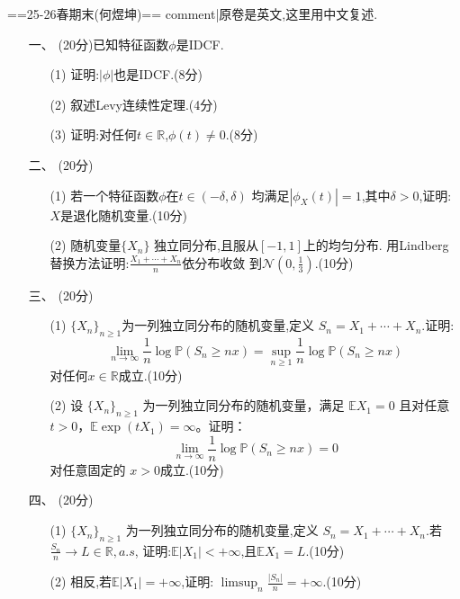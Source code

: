 
==25-26春期末(何煜坤)==
{{comment|原卷是英文,这里用中文复述.}}
\begin{itemize}
    \item[一、](20分)已知特征函数$\phi$是IDCF.
    \begin{itemize}
        \item[(1)]证明:$|\phi|$也是IDCF.(8分)
        \item[(2)]叙述Levy连续性定理.(4分)
        \item[(3)]证明:对任何$t\in\mathbb{R}$,$\phi(t)\ne 0$.(8分)
    \end{itemize}
    \item[二、](20分)
    \begin{itemize}
        \item[(1)]若一个特征函数$\phi$在$t\in(-\delta,\delta)$
        均满足$|\phi_X(t)|=1$,其中$\delta>0$,证明:$X$是退化随机变量.(10分)
        \item[(2)]随机变量$\{X_n\}$
        独立同分布,且服从$[-1,1]$上的均匀分布.
        用Lindberg替换方法证明:$\frac{X_1+\cdots+X_n}{n}$依分布收敛
        到$\mathcal{N}(0,\frac13)$.(10分)
    \end{itemize}
    \item[三、](20分)
    \begin{itemize}
        \item[(1)]$\{X_n\}_{n\ge 1}$为一列独立同分布的随机变量,定义
        $S_n=X_1+\cdots+X_n$.证明:
        \[\lim_{n\rightarrow \infty}\frac1n\log\mathbb{P}(S_n\ge nx)=\sup_{n\ge 1}\frac1n\log\mathbb{P}(S_n\ge nx)\]
        对任何$x\in \mathbb{R}$成立.(10分)
        \item[(2)]设 $\{X_n\}_{n \geq 1}$ 为一列独立同分布的随机变量，满足 $\mathbb{E}X_1 = 0$ 且对任意 $t > 0$，$\mathbb{E}\exp(tX_1) = \infty$。证明：
        \[
        \lim_{n \to \infty} \frac{1}{n} \log \mathbb{P}(S_n \geq nx) = 0
        \]
        对任意固定的 $x > 0$成立.(10分)
    \end{itemize}

    \item[四、](20分)
    \begin{itemize}
        \item[(1)]$\{X_n\}_{n \geq 1}$ 为一列独立同分布的随机变量,定义
        $S_n=X_1+\cdots+X_n$.若$\frac{S_n}{n}\rightarrow L\in\mathbb{R},a.s$,
        证明:$\mathbb{E}|X_1|<+\infty$,且$\mathbb{E}X_1=L$.(10分)
        \item[(2)]相反,若$\mathbb{E}|X_1|=+\infty$,证明:
        $\limsup_{n}\frac{|S_n|}{n}=+\infty$.(10分)
    \end{itemize}


\end{itemize}
